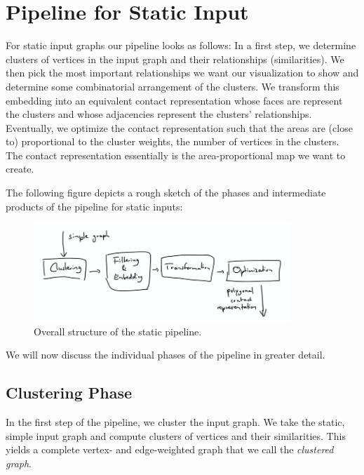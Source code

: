 \section{Pipeline for Static Input}
\label{sect:pipeline-for-static-input}

For static input graphs our pipeline looks as follows: In a first step, we determine clusters of vertices in the input graph and their relationships (similarities). We then pick the most important relationships we want our visualization to show and determine some combinatorial arrangement of the clusters. We transform this embedding into an equivalent contact representation whose faces are represent the clusters and whose adjacencies represent the clusters' relationships. Eventually, we optimize the contact representation such that the areas are (close to) proportional to the cluster weights, \ie{} the number of vertices in the clusters. The contact representation essentially is the area-proportional map we want to create.

The following figure depicts a rough sketch of the phases and intermediate products of the pipeline for static inputs:

\begin{figure}[H]
	\centering\includegraphics[height=140px]{Resources/Pipeline-Static.png}
	\caption{Overall structure of the static pipeline.}
	\label{fig:pipeline-static}
\end{figure}

We will now discuss the individual phases of the pipeline in greater detail.



\subsection{Clustering Phase}

In the first step of the pipeline, we cluster the input graph. We take the static, simple input graph and compute clusters of vertices and their similarities. This yields a complete vertex- and edge-weighted graph that we call the \emph{clustered graph}.

